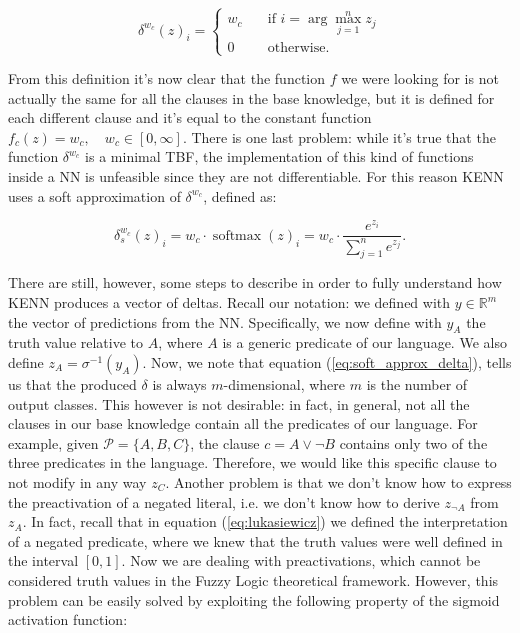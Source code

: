 \begin{equation*}
\delta^{w_c}(z)_i = 
\begin{cases}
w_c \quad &\text{if } i = \arg\max_{j=1}^nz_j \\
0 \quad &\text{otherwise.}
\end{cases}
\end{equation*}

From this definition it's now clear that the function $f$ we were looking for is not actually the same for all the clauses in the base knowledge, but it is defined for each different clause and it's equal to the constant function $f_c(z) = w_c, \quad w_c \in \left[0, \infty\right]$. 
There is one last problem: while it's true that the function $\delta^{w_c}$ is a minimal TBF, the implementation of this kind of functions inside a NN is unfeasible since they are not differentiable. For this reason KENN uses a soft approximation of $\delta^{w_c}$, defined as:

\begin{equation}
\delta_s^{w_c}(z)_i = w_c \cdot \operatorname{softmax}(z)_i = w_c \cdot \frac{e^{z_i}}{\sum_{j=1}^ne^{z_j}}.
\label{eq:soft_approx_delta}
\end{equation}

There are still, however, some steps to describe in order to fully understand how KENN produces a vector of deltas. Recall our notation: we defined with $y \in \mathbb{R}^m$ the vector of predictions from the NN. Specifically, we now define with $y_A$ the truth value relative to $A$, where $A$ is a generic predicate of our language. We also define $z_A=\sigma^{-1}(y_A)$. Now, we note that equation (\ref{eq:soft_approx_delta}), tells us that the produced $\delta$ is always $m$-dimensional, where $m$ is the number of output classes. This however is not desirable: in fact, in general, not all the clauses in our base knowledge contain all the predicates of our language. For example, given $\mathcal{P}=\{A,B,C\}$, the clause $c = A \vee \neg B$ contains only two of the three predicates in the language. Therefore, we would like this specific clause to not modify in any way $z_C$. Another problem is that we don't know how to express the preactivation of a negated literal, i.e. we don't know how to derive $z_{\neg A}$ from $z_A$. In fact, recall that in equation (\ref{eq:lukasiewicz}) we defined the interpretation of a negated predicate, where we knew that the truth values were well defined in the interval $\left[0,1\right]$. Now we are dealing with preactivations, which cannot be considered truth values in the Fuzzy Logic theoretical framework. However, this problem can be easily solved by exploiting the following property of the sigmoid activation function:

